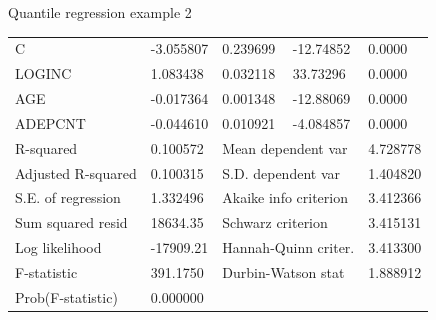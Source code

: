 \documentclass{beamer}
\begin{document}
\begin{frame}{Quantile regression example 2}
\begin{table}[]
\begin{tabular}{@{}lllll@{}}
\midrule
C                                                    & -3.055807                                    & 0.239699                                    & -12.74852                                    & 0.0000                                    \\
LOGINC                                               & 1.083438                                     & 0.032118                                    & 33.73296                                     & 0.0000                                    \\
AGE                                                  & -0.017364                                    & 0.001348                                    & -12.88069                                    & 0.0000                                    \\
ADEPCNT                                              & -0.044610                                    & 0.010921                                    & -4.084857                                    & 0.0000                                    \\
\midrule
R-squared                                            & 0.100572                                     & \multicolumn{2}{l}{Mean dependent var}                                                     & 4.728778                                  \\
Adjusted R-squared                                   & 0.100315                                     & \multicolumn{2}{l}{S.D. dependent var}                                                     & 1.404820                                  \\
S.E. of regression                                   & 1.332496                                     & \multicolumn{2}{l}{Akaike info criterion}                                                  & 3.412366                                  \\
Sum squared resid                                    & 18634.35                                     & \multicolumn{2}{l}{Schwarz criterion}                                                      & 3.415131                                  \\
Log likelihood                                       & -17909.21                                    & \multicolumn{2}{l}{Hannah-Quinn criter.}                                                   & 3.413300                                  \\
F-statistic                                          & 391.1750                                     & \multicolumn{2}{l}{Durbin-Watson stat}                                                     & 1.888912                                  \\
Prob(F-statistic)                                    & 0.000000                                     & \multicolumn{2}{l}{}                                                                       &                                           \\ \bottomrule
\end{tabular}
\end{table}
\end{frame}
\end{document}
